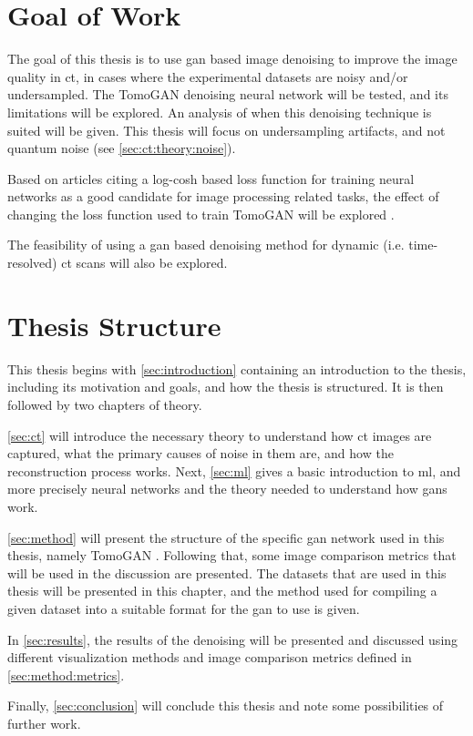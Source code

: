 \section{Goal of Work}
The goal of this thesis is to use \gls{gan} based image denoising to improve the image quality in \gls{ct}, in cases where the experimental datasets are noisy and/or undersampled. The TomoGAN \cite{liu2020tomogan} denoising neural network will be tested, and its limitations will be explored. An analysis of when this denoising technique is suited will be given. This thesis will focus on undersampling artifacts, and not quantum noise (see \cref{sec:ct:theory:noise}). 

Based on articles citing a log-cosh based loss function for training neural networks as a good candidate for image processing related tasks, the effect of changing the loss function used to train TomoGAN will be explored \cite{chen2019log,7797130}. 

The feasibility of using a \gls{gan} based denoising method for dynamic (i.e. time-resolved) \gls{ct} scans will also be explored. 

\section{Thesis Structure}
This thesis begins with \cref{sec:introduction} containing an introduction to the thesis, including its motivation and goals, and how the thesis is structured. It is then followed by two chapters of theory. 

\cref{sec:ct} will introduce the necessary theory to understand how \gls{ct} images are captured, what the primary causes of noise in them are, and how the reconstruction process works. Next, \cref{sec:ml} gives a basic introduction to \gls{ml}, and more precisely neural networks and the theory needed to understand how \gls{gan}s work. 

\cref{sec:method} will present the structure of the specific \gls{gan} network used in this thesis, namely TomoGAN \cite{liu2020tomogan}. Following that, some image comparison metrics that will be used in the discussion are presented. The datasets that are used in this thesis will be presented in this chapter, and the method used for compiling a given dataset into a suitable format for the \gls{gan} to use is given. 

In \cref{sec:results}, the results of the denoising will be presented and discussed using different visualization methods and image comparison metrics defined in \cref{sec:method:metrics}.

Finally, \cref{sec:conclusion} will conclude this thesis and note some possibilities of further work. 